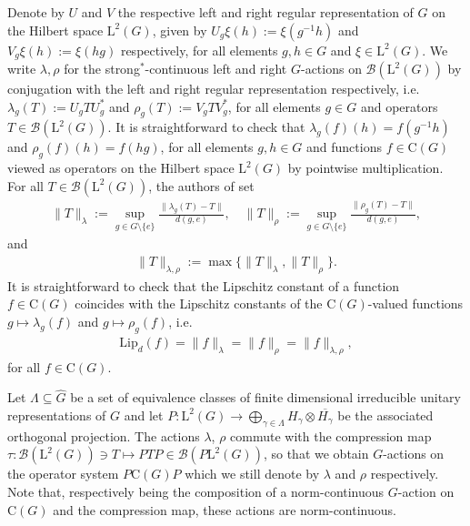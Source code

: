 \documentclass{amsart}
\theoremstyle{plain}
\theoremstyle{definition}
\theoremstyle{remark}
\begin{document}
	Denote by $U$ and $V$ the respective left and right regular representation of $G$ on the Hilbert space $\mathrm{L}^2(G)$, given by $U_g\xi(h) := \xi(g^{-1}h)$ and $V_g\xi(h) := \xi(hg)$ respectively, for all elements $g,h \in G$ and $\xi \in \mathrm{L}^2(G)$. 
	We write $\lambda, \rho$ for the strong$^*$-continuous left and right $G$-actions on $\mathcal{B}(\mathrm{L}^2(G))$ by conjugation with the left and right regular representation respectively, i.e.\@ $\lambda_g(T) := U_gTU_g^*$ and $\rho_g(T) := V_gTV_g^*$, for all elements $g \in G$ and operators $T \in \mathcal{B}(\mathrm{L}^2(G))$.
	It is straightforward to check that $\lambda_g(f)(h) = f(g^{-1}h)$ and $\rho_g(f)(h) = f(hg)$, for all elements $g,h \in G$ and functions $f \in \mathrm{C}(G)$ viewed as operators on the Hilbert space $\mathrm{L}^2(G)$ by pointwise multiplication.
	For all $T \in \mathcal{B}(\mathrm{L}^2(G))$, the authors of \cite{GEvS23} set
	\begin{align}\label{eqn:GEvS-Lip-norm}
		\lVert T\rVert_\lambda := \sup_{g \in G\setminus\{e\}} \frac{\lVert \lambda_g(T)-T\rVert}{d(g,e)}, \quad
		\lVert T\rVert_\rho := \sup_{g \in G\setminus\{e\}} \frac{\lVert\rho_g(T)-T\rVert}{d(g,e)},
	\end{align}
	and
	\begin{align}
		\lVert T \rVert_{\lambda,\rho} := \max\{\lVert T\rVert_\lambda, \lVert T\rVert_\rho\}.
	\end{align}
	It is straightforward to check that the Lipschitz constant of a function $f \in \mathrm{C}(G)$ coincides with the Lipschitz constants of the $\mathrm{C}(G)$-valued functions $g \mapsto \lambda_g(f)$ and $g \mapsto \rho_g(f)$, i.e.\@
	\begin{align}
		\mathrm{Lip}_d(f) = \lVert f \rVert_\lambda = \lVert f \rVert_\rho = \lVert f \rVert_{\lambda,\rho},
	\end{align}
	for all $f \in \mathrm{C}(G)$.
	
	Let $\Lambda \subseteq \widehat{G}$ be a set of equivalence classes of finite dimensional irreducible unitary representations of $G$ and let $P : \mathrm{L}^2(G) \rightarrow \bigoplus_{\gamma \in \Lambda} H_\gamma \otimes \overline{H_\gamma}$ be the associated orthogonal projection.
	The actions $\lambda$, $\rho$ commute with the compression map $\tau : \mathcal{B}(\mathrm{L}^2(G)) \ni T \mapsto PTP \in \mathcal{B}(P\mathrm{L}^2(G))$, so that we obtain $G$-actions on the operator system $P\mathrm{C}(G)P$ which we still denote by $\lambda$ and $\rho$ respectively.
	Note that, respectively being the composition of a norm-continuous $G$-action on $\mathrm{C}(G)$ and the compression map, these actions are norm-continuous.
	
\end{document}
